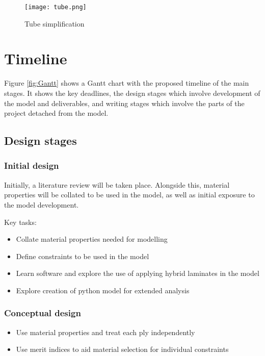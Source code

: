 \documentclass[9pt,twocolumn,twoside]{article}
\begin{document}
\begin{figure}[h!]
    \centering
    \texttt{[image: tube.png]} 
    \caption{Tube simplification}
    \label{fig:tube}
\end{figure}

\section{Timeline}

Figure \ref{fig:Gantt} shows a Gantt chart with the proposed timeline of the main stages. It shows the key deadlines, the design stages which involve development of the model and deliverables, and writing stages which involve the parts of the project detached from the model.

\subsection{Design stages}

\subsubsection{Initial design}

Initially, a literature review will be taken place. Alongside this, material properties will be collated to be used in the model, as well as initial exposure to the model development.

Key tasks:
\begin{itemize}
    \item Collate material properties needed for modelling
    \item Define constraints to be used in the model
    \item Learn software and explore the use of applying hybrid laminates in the model
    \item Explore creation of python model for extended analysis
\end{itemize}

\subsubsection{Conceptual design}

\begin{itemize}
    \item Use material properties and treat each ply independently 
    \item Use merit indices to aid material selection for individual constraints
\end{itemize}
\end{document}
